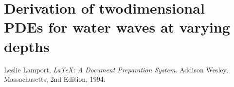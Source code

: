 \documentclass[a4paper]{report}
\begin{document}
\chapter{Derivation of twodimensional PDEs for water waves at varying depths}


\iffalse




\else

\begin{thebibliography}{99}
    
    Leslie Lamport,
    \emph{\LaTeX: A Document Preparation System}.
    Addison Wesley, Massachusetts,
    2nd Edition,
    1994.
    
\end{thebibliography}

\fi
\end{document}
